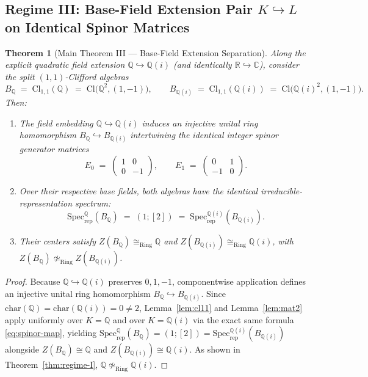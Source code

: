 \documentclass[11pt,a4paper]{article}
\theoremstyle{plain}
\newtheorem{theorem}{Theorem}[section]
\theoremstyle{definition}
\newcommand{\Cl}{\mathrm{Cl}}
\newcommand{\Specrep}{\mathrm{Spec}_{\mathrm{rep}}}
\newcommand{\Q}{\mathbb{Q}}
\newcommand{\R}{\mathbb{R}}
\newcommand{\C}{\mathbb{C}}
\begin{document}
\subsection{Regime III: Base-Field Extension Pair \texorpdfstring{$K \hookrightarrow L$}{K -> L} on Identical Spinor Matrices}

\begin{theorem}[Main Theorem III --- Base-Field Extension Separation]\label{thm:regime-III}
Along the explicit quadratic field extension $\Q \hookrightarrow \Q(i)$ (and identically $\R \hookrightarrow \C$), consider the split $(1,1)$-Clifford algebras
\[
  B_\Q \;=\; \Cl_{1,1}(\Q) \;=\; \Cl\bigl(\Q^2, (1,-1)\bigr),
  \qquad
  B_{\Q(i)} \;=\; \Cl_{1,1}(\Q(i)) \;=\; \Cl\bigl(\Q(i)^2, (1,-1)\bigr).
\]
Then:
\begin{enumerate}
  \item The field embedding $\Q \hookrightarrow \Q(i)$ induces an injective unital ring homomorphism $B_\Q \hookrightarrow B_{\Q(i)}$ intertwining the identical integer spinor generator matrices
  \[
    E_0 \;=\; \begin{pmatrix} 1 & 0 \\ 0 & -1 \end{pmatrix},
    \qquad
    E_1 \;=\; \begin{pmatrix} 0 & 1 \\ -1 & 0 \end{pmatrix}.
  \]
  \item Over their respective base fields, both algebras have the identical irreducible-representation spectrum:
  \[
    \Specrep^\Q(B_\Q) \;=\; (1;[2]) \;=\; \Specrep^{\Q(i)}(B_{\Q(i)}).
  \]
  \item Their centers satisfy $Z(B_\Q) \cong_{\mathrm{Ring}} \Q$ and $Z(B_{\Q(i)}) \cong_{\mathrm{Ring}} \Q(i)$, with $Z(B_\Q) \not\simeq_{\mathrm{Ring}} Z(B_{\Q(i)})$.
\end{enumerate}
\end{theorem}

\begin{proof}
Because $\Q \hookrightarrow \Q(i)$ preserves $0, 1, -1$, componentwise application defines an injective unital ring homomorphism $B_\Q \hookrightarrow B_{\Q(i)}$. Since $\mathrm{char}(\Q) = \mathrm{char}(\Q(i)) = 0 \neq 2$, Lemma~\ref{lem:cl11} and Lemma~\ref{lem:mat2} apply uniformly over $K = \Q$ and over $K = \Q(i)$ via the exact same formula \eqref{eq:spinor-map}, yielding $\Specrep^\Q(B_\Q) = (1;[2]) = \Specrep^{\Q(i)}(B_{\Q(i)})$ alongside $Z(B_\Q) \cong \Q$ and $Z(B_{\Q(i)}) \cong \Q(i)$. As shown in Theorem~\ref{thm:regime-I}, $\Q \not\simeq_{\mathrm{Ring}} \Q(i)$.
\end{proof}
\end{document}
